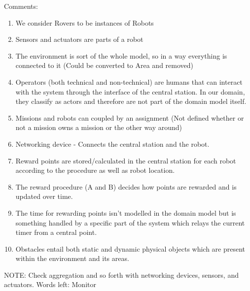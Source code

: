 Comments: \begin{enumerate}
    \item We consider Rovers to be instances of Robots
    \item Sensors and actuators are parts of a robot
    \item The environment is sort of the whole model, so in a way everything is connected to it (Could be converted to Area and removed)
    \item Operators (both technical and non-technical) are humans that can interact with the system through the interface of the central station. In our domain, they classify as actors and therefore are not part of the domain model itself.
    \item Missions and robots can coupled by an assignment (Not defined whether or not a mission owns a mission or the other way around)
    \item Networking device - Connects the central station and the robot.
    \item Reward points are stored/calculated in the central station for each robot according to the procedure as well as robot location.
    \item The reward procedure (A and B) decides how points are rewarded and is updated over time.
    \item The time for rewarding points isn't modelled in the domain model but is something handled by a specific part of the system which relays the current timer from a central point.
	\item Obstacles entail both static and dynamic physical objects which are present within the environment and its areas.
\end{enumerate} 

NOTE: Check aggregation and so forth with networking devices, sensors, and actuators.
Words left: Monitor